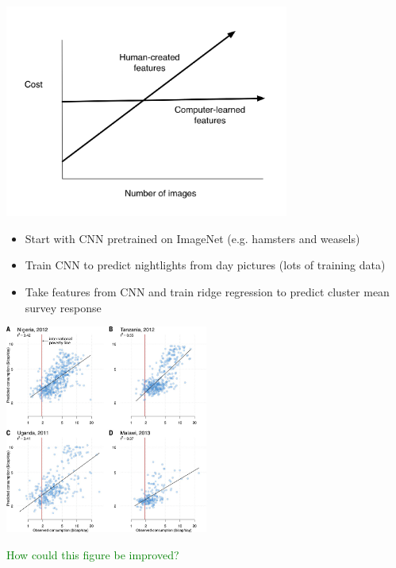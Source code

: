 \documentclass[aspectratio=169]{beamer}
\def\vf{\vfill}
\begin{document}
\begin{frame}

\begin{center}
\includegraphics[width=0.7\textwidth]{figures/zero_variable_cost_features}
\end{center}

\end{frame}
\begin{frame}

\begin{itemize}
\item Start with CNN pretrained on ImageNet (e.g. hamsters and weasels)
\pause
\item Train CNN to predict nightlights from day pictures (lots of training data)
\pause
\item Take features from CNN and train ridge regression to predict cluster mean survey response
\end{itemize}

\end{frame}
\begin{frame}

\begin{center}
\includegraphics[width=0.5\textwidth]{figures/jean_combining_2016_fig3}
\end{center}
\vf
\textcolor{green}{How could this figure be improved?}

\end{frame}
\end{document}
